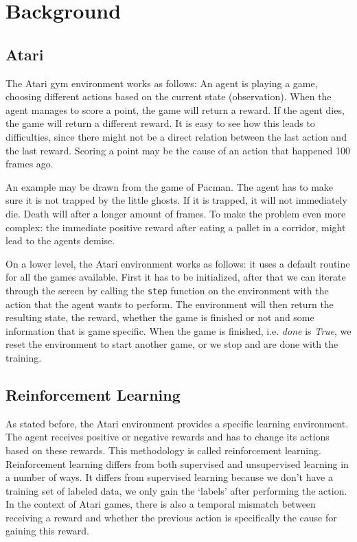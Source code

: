 \documentclass{article}
\begin{document}
\section{Background}

\subsection{Atari}

The Atari gym environment works as follows: An agent is playing a game, choosing different actions based on the current state (observation). When the agent manages to score a point, the game will return a reward. If the agent dies, the game will return a different reward. It is easy to see how this leads to difficulties, since there might not be a direct relation between the last action and the last reward. Scoring a point may be the cause of an action that happened 100 frames ago.

An example may be drawn from the game of Pacman. The agent has to make sure it is not trapped by the little ghosts. If it is trapped, it will not immediately die. Death will after a longer amount of frames. To make the problem even more complex: the immediate positive reward after eating a pallet in a corridor, might lead to the agents demise.

On a lower level, the Atari environment works as follows: it uses a default routine for all the games available. First it has to be initialized, after that we can iterate through the screen by calling the \texttt{step} function on the environment with the action that the agent wants to perform. The environment will then return the resulting state, the reward, whether the game is finished or not and some information that is game specific. When the game is finished, i.e. \textit{done} is \textit{True}, we reset the environment to start another game, or we stop and are done with the training.

\subsection{Reinforcement Learning}

As stated before, the Atari environment provides a specific learning environment. The agent receives positive or negative rewards and has to change its actions based on these rewards. This methodology is called reinforcement learning. Reinforcement learning differs from both supervised and unsupervised learning in a number of ways. It differs from supervised learning because we don't have a training set of labeled data, we only gain the `labels' after performing the action. In the context of Atari games, there is also a temporal mismatch between receiving a reward and whether the previous action is specifically the cause for gaining this reward.
\end{document}
